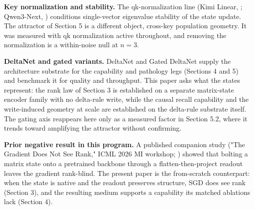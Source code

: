 \textbf{Key normalization and stability.} The qk-normalization line (Kimi Linear, \citealp{kimiteam2025kimilinearexpressiveefficient}; Qwen3-Next, \citealp{qwenteam2025qwen3next}) conditions
single-vector eigenvalue stability of the state update. The attractor
of Section 5 is a different object, cross-key population geometry. It
was measured with qk normalization active throughout, and removing the
normalization is a within-noise null at $n{=}3$.

\textbf{DeltaNet and gated variants.} DeltaNet \citep{yang2025parallelizinglineartransformersdelta} and Gated DeltaNet \citep{yang2025gateddeltanetworksimproving} supply the architecture substrate for the capability and pathology
legs (Sections 4 and 5) and benchmark it for quality and throughput.
This paper asks what the states represent: the rank law of Section 3 is
established on a separate matrix-state encoder family with no
delta-rule write, while the causal recall capability and the
write-induced geometry at scale are established on the delta-rule
substrate itself. The gating
axis reappears here only as a measured factor in Section 5.2, where it
trends toward amplifying the attractor without confirming.

\textbf{Prior negative result in this program.} A published companion study
("The Gradient Does Not See Rank," ICML 2026 MI workshop; \citealp{larson2026the}) showed that
bolting a matrix state onto a pretrained backbone through a
flatten-then-project readout leaves the gradient rank-blind. The
present paper is the from-scratch counterpart: when the state is native
and the readout preserves structure, SGD does see rank (Section 3), and
the resulting medium supports a capability its matched ablations lack
(Section 4).

